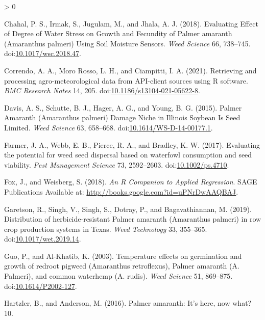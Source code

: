 \documentclass[utf8]{frontiersSCNS}
\newlength{\cslhangindent}
\newenvironment{CSLReferences}[2] %
 {%
  \setlength{\parindent}{0pt}
  \ifodd #1 \everypar{\setlength{\hangindent}{\cslhangindent}}\ignorespaces\fi
  \ifnum #2 > 0
  \setlength{\parskip}{#2\baselineskip}
  \fi
 }%
 {}
\begin{document}
\begin{CSLReferences}{1}{0}
\leavevmode\hypertarget{ref-chahal2018}{}%
Chahal, P. S., Irmak, S., Jugulam, M., and Jhala, A. J. (2018).
Evaluating {Effect} of {Degree} of {Water Stress} on {Growth} and
{Fecundity} of {Palmer} amaranth ({Amaranthus} palmeri) {Using Soil
Moisture Sensors}. \emph{Weed Science} 66, 738--745.
doi:\href{https://doi.org/10.1017/wsc.2018.47}{10.1017/wsc.2018.47}.

\leavevmode\hypertarget{ref-correndo2021}{}%
Correndo, A. A., Moro Rosso, L. H., and Ciampitti, I. A. (2021).
Retrieving and processing agro-meteorological data from {API}-client
sources using {R} software. \emph{BMC Research Notes} 14, 205.
doi:\href{https://doi.org/10.1186/s13104-021-05622-8}{10.1186/s13104-021-05622-8}.

\leavevmode\hypertarget{ref-davis2015}{}%
Davis, A. S., Schutte, B. J., Hager, A. G., and Young, B. G. (2015).
Palmer {Amaranth} ({Amaranthus} palmeri) {Damage Niche} in {Illinois
Soybean Is Seed Limited}. \emph{Weed Science} 63, 658--668.
doi:\href{https://doi.org/10.1614/WS-D-14-00177.1}{10.1614/WS-D-14-00177.1}.

\leavevmode\hypertarget{ref-farmer2017}{}%
Farmer, J. A., Webb, E. B., Pierce, R. A., and Bradley, K. W. (2017).
Evaluating the potential for weed seed dispersal based on waterfowl
consumption and seed viability. \emph{Pest Management Science} 73,
2592--2603. doi:\href{https://doi.org/10.1002/ps.4710}{10.1002/ps.4710}.

\leavevmode\hypertarget{ref-fox2018}{}%
Fox, J., and Weisberg, S. (2018). \emph{An {R Companion} to {Applied
Regression}}. {SAGE Publications} Available at:
\url{http://books.google.com?id=uPNrDwAAQBAJ}.

\leavevmode\hypertarget{ref-garetson2019}{}%
Garetson, R., Singh, V., Singh, S., Dotray, P., and Bagavathiannan, M.
(2019). Distribution of herbicide-resistant {Palmer} amaranth
({Amaranthus} palmeri) in row crop production systems in {Texas}.
\emph{Weed Technology} 33, 355--365.
doi:\href{https://doi.org/10.1017/wet.2019.14}{10.1017/wet.2019.14}.

\leavevmode\hypertarget{ref-guo2003}{}%
Guo, P., and Al-Khatib, K. (2003). Temperature effects on germination
and growth of redroot pigweed ({Amaranthus} retroflexus), {Palmer}
amaranth ({A}. Palmeri), and common waterhemp ({A}. rudis). \emph{Weed
Science} 51, 869--875.
doi:\href{https://doi.org/10.1614/P2002-127}{10.1614/P2002-127}.

\leavevmode\hypertarget{ref-hartzler2016}{}%
Hartzler, B., and Anderson, M. (2016). Palmer amaranth: {It}'s here, now
what? 10.


\end{CSLReferences}
\end{document}
